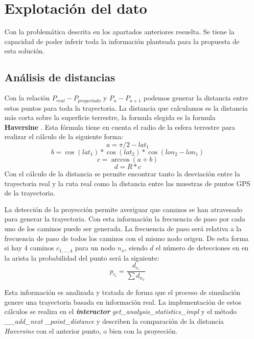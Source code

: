 \section{Explotación del dato}
\label{section:ExplotacionDato}
Con la problemática descrita en los apartados anteriores resuelta. Se tiene la capacidad de poder 
inferir toda la información planteada para la propuesta de esta solución.

\subsection{Análisis de distancias}
\label{section: AnalisisDistancias}
Con la relación $P_{real} - P_{proyectado}$ y $P_{n} - P_{n+1}$ podemos generar la distancia entre estos puntos 
para toda la trayectoria. La distancia que calculamos es la distancia más corta sobre la superficie terrestre, 
la formula elegida es la formula \textbf{Haversine} \cite{Gis01} \cite{Haver01}. Esta fórmula tiene en cuenta 
el radio de la esfera terrestre para realizar el cálculo de la siguiente forma:
\begin{equation}
a = \pi/2 - lat_{1}
\end{equation}
\begin{equation}
b = \cos(lat_{1}) * \cos(lat_{2}) * \cos(lon_{2} - lon_{1})
\end{equation}
\begin{equation}
c = \arccos(a + b)
\end{equation}
\begin{equation}
d = R * c
\end{equation}
Con el cálculo de la distancia se permite encontrar tanto la desviación entre la trayectoria real y la 
ruta real como la distancia entre las muestras de puntos \ac{GPS} de la trayectoria.

La detección de la proyección permite averiguar que caminos se han atravesado para generar la 
trayectoria. Con esta información la frecuencia de paso por cada uno de los
caminos puede ser generada. La frecuencia de paso será relativa a la frecuencia de paso de todos 
los caminos con el mismo nodo origen. De esta forma si hay 4 caminos $c_{1,...,4}$ para un nodo 
$n_{x}$, siendo $d$ el número de detecciones en en la arista la probabilidad del punto será la 
siguiente:
\begin{equation}
p_{c_{i}} = \frac{d_{c_{i}}}{\sum{d_{n_{x}}}}
\end{equation}


Esta información es analizada y tratada de forma que el proceso de simulación genere una 
trayectoria basada en información real. La implementación de estos cálculos se realiza en el 
\textbf{\textit{interactor}} \textit{get\_analysis\_statistics\_impl} y el método \textit{\_\_add\_next
\_point\_distance} y describen la comparación de la distancia \textit{Haversine} con el anterior 
punto, o bien con la proyección.

